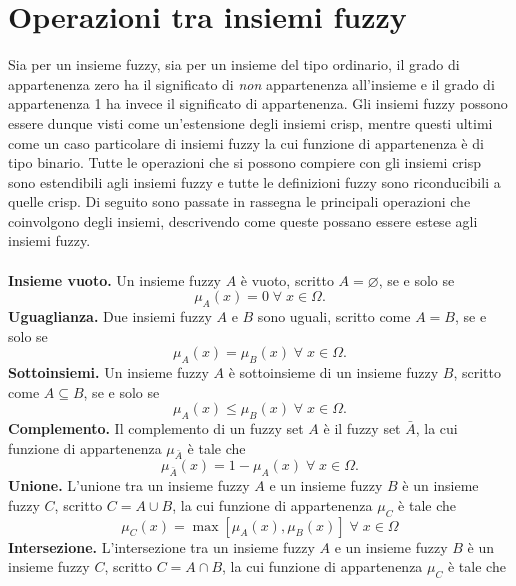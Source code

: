 \documentclass [11pt,a4paper,twoside,openright] {book}
\begin{document}
\section{Operazioni tra insiemi fuzzy}
Sia per un insieme fuzzy, sia per un insieme del tipo ordinario, il grado di appartenenza zero ha il significato di \textit{non} appartenenza all'insieme e il grado di appartenenza 1 ha invece il significato di appartenenza. Gli insiemi fuzzy possono essere dunque visti come un'estensione degli insiemi crisp, mentre questi ultimi come un caso particolare di insiemi fuzzy la cui funzione di appartenenza è di tipo binario. Tutte le operazioni che si possono compiere con gli insiemi crisp sono estendibili agli insiemi fuzzy e tutte le definizioni fuzzy sono riconducibili a quelle crisp. Di seguito sono passate in rassegna le principali operazioni che coinvolgono degli insiemi, descrivendo come queste possano essere estese agli insiemi fuzzy.\\\\
\textbf{Insieme vuoto.} Un insieme fuzzy $A$ è vuoto, scritto $A = \varnothing$, se e solo se
\begin{equation} \mu_A(x) = 0 \; \forall \; x \in \Omega.\end{equation} 
\textbf{Uguaglianza.} Due insiemi fuzzy $A$ e $B$ sono uguali, scritto come $A=B$, se e solo se
\begin{equation} \mu_A(x) = \mu_B(x) \; \forall \; x \in \Omega.\end{equation} 
\textbf{Sottoinsiemi.} Un insieme fuzzy $A$ è sottoinsieme di un insieme fuzzy $B$, scritto come $A \subseteq B$, se e solo se
\begin{equation} \mu_A(x) \leq \mu_B(x) \; \forall \; x \in \Omega.\end{equation} 
\textbf{Complemento.} Il complemento di un fuzzy set $A$ è il fuzzy set $\bar{A}$, la cui funzione di appartenenza $\mu_{\bar{A}}$ è tale che
\begin{equation} \mu_{\bar{A}}(x) = 1-\mu_A(x) \; \forall \; x \in \Omega.\end{equation} 
\textbf{Unione.} L'unione tra un insieme fuzzy $A$ e un insieme fuzzy $B$ è un insieme fuzzy $C$, scritto $C=A \cup B$, la cui funzione di appartenenza $\mu_C$ è tale che
\begin{equation}\label{unione} \mu_C(x) = \max[\mu_A(x), \mu_B(x)] \; \forall \; x \in \Omega \end{equation} 
\textbf{Intersezione.} L'intersezione tra un insieme fuzzy $A$ e un insieme fuzzy $B$ è un insieme fuzzy $C$, scritto $C=A \cap B$, la cui funzione di appartenenza $\mu_C$ è tale che
\end{document}
